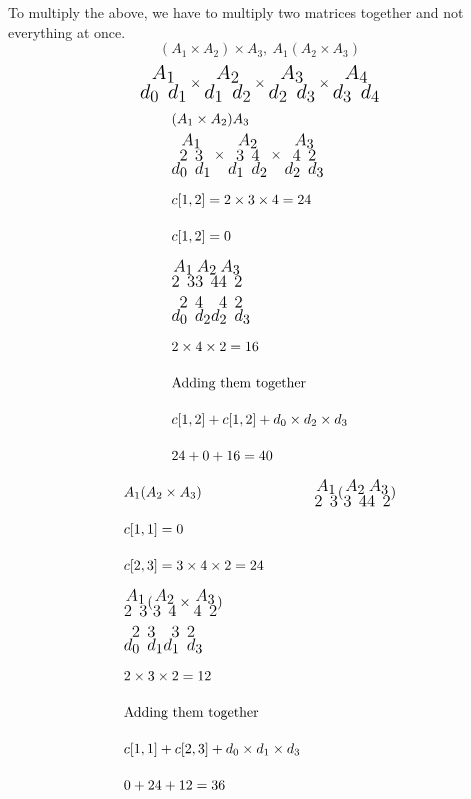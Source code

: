 \documentclass[12pt]{report}
\begin{document}
	To multiply the above, we have to multiply two matrices together and not everything at once.
	$$(A_1 \times A_2)\times A_3, ~ A_1(A_2\times A_3)$$
	$$\huge\substack{A_1\\ {d_0 ~d_1}} \times \substack{A_2\\ {d_1 ~d_2}} \times \substack{A_3\\ {d_2 ~d_3}}\times \substack{A_4\\ {d_3 ~d_4}}$$
	\begin{align*}
		&(A_1 \times A_2) A_3\\
		&\LARGE\substack{A_1\\ {2 ~3}\\d_0 ~d_1} \times \substack{A_2\\ {3 ~4}\\d_1 ~d_2} \times \substack{A_3\\ {4 ~2}\\d_2 ~d_3}\\
		&c[1,2] = 2\times 3\times 4 = 24\\
		&c[1,2] = 0\\
		&\LARGE\substack{A_1\\ {2 ~3}} \substack{A_2\\ {3 ~4}} \substack{A_3\\ {4 ~2}}\\
		&\LARGE\substack{{2 ~4}\\d_0 ~d_2} \substack{{4 ~2}\\d_2 ~d_3}\\
		&2\times 4 \times 2 = 16\\
		&\text{Adding them together}\\
		&c[1,2] + c[1,2] + d_0 \times d_2 \times d_3\\
		& 24 + 0 + 16 = 40
	\end{align*} 
	\begin{align*}
		&A_1(A_2\times A_3)
		&\LARGE\substack{A_1\\ {2 ~3}}( \substack{A_2\\ {3 ~4}} \substack{A_3\\ {4 ~2}})\\
		&c[1,1] = 0\\
		&c[2,3] = 3\times 4 \times 2 = 24\\
		&\LARGE\substack{A_1\\ {2 ~3}} (\substack{A_2\\ {3 ~4}} \times \substack{A_3\\ {4 ~2}})\\
		&\LARGE\substack{{2 ~3}\\d_0 ~d_1} \substack{{3 ~2}\\d_1 ~d_3}\\
		&2\times 3 \times 2 = 12\\
		&\text{Adding them together}\\
		&c[1,1] + c[2,3] + d_0 \times d_1 \times d_3\\
		& 0 + 24 + 12 = 36
	\end{align*}
\end{document}
